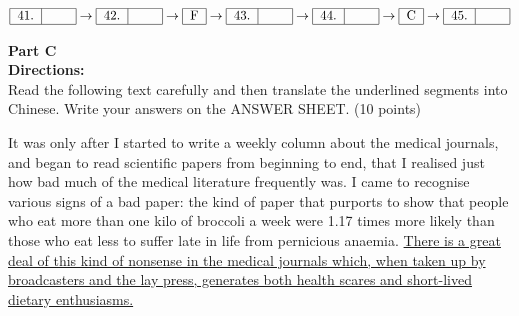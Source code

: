 \[ 
\begin{tabular}{|c|c|}
	\hline
	41. &  \hspace{1.5em} \\
	\hline
\end{tabular}
\rightarrow
\begin{tabular}{|c|c|}
	\hline
	42. &  \hspace{1.5em} \\
	\hline
\end{tabular}
\rightarrow
\begin{tabular}{|c|}
	\hline
	F \\
	\hline
\end{tabular}
\rightarrow
\begin{tabular}{|c|c|}
	\hline
	43. &  \hspace{1.5em} \\
	\hline
\end{tabular}
\rightarrow
\begin{tabular}{|c|c|}
	\hline
	44. &  \hspace{1.5em} \\
	\hline
\end{tabular}
\rightarrow
\begin{tabular}{|c|}
	\hline
	C \\
	\hline
\end{tabular}
\rightarrow
\begin{tabular}{|c|c|}
	\hline
	45. &  \hspace{1.5em} \\
	\hline
\end{tabular}
\]


\phantom{ \linefill \linefill \linefill \linefill \linefill}


\newpage

\noindent
\textbf{Part C}\\
\textbf{Directions:}\\
 Read the following text carefully and then translate
the underlined segments into Chinese. Write your answers on the ANSWER SHEET. (10 points)


\TiGanSpace


It was only after I started to write a weekly column about the
medical journals, and began to read scientific papers from beginning to
end, that I realised just how bad much of the medical literature
frequently was. I came to recognise various signs of a bad paper: the
kind of paper that purports to show that people who eat more than one
kilo of broccoli a week were 1.17 times more likely than those who eat
less to suffer late in life from pernicious anaemia. \transnum \uline{There is a
great deal of this kind of nonsense in the medical journals which, when
taken up by broadcasters and the lay press, generates both health scares
and short-lived dietary enthusiasms. }



